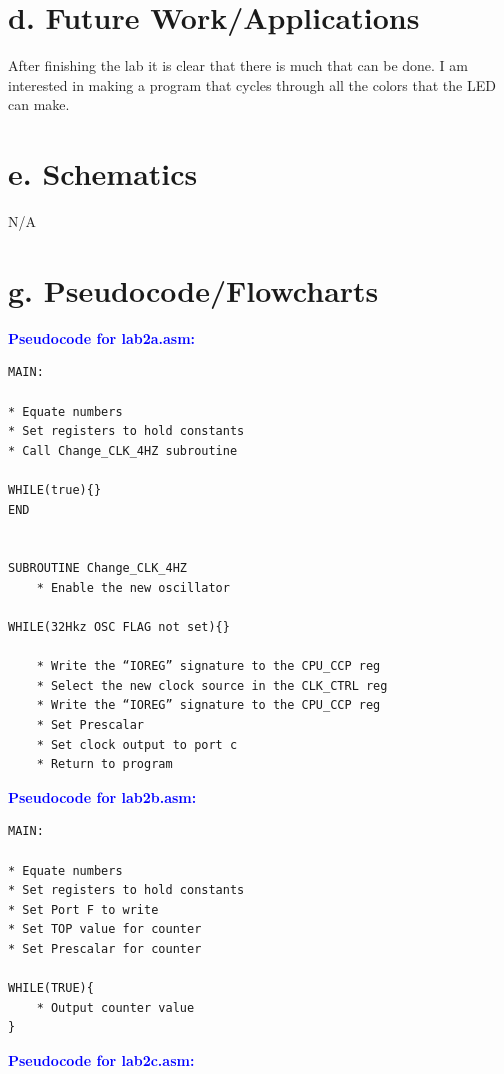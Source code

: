 \documentclass[11pt]{article}
\theoremstyle{plain}
\theoremstyle{definition}
\begin{document}
\section*{d. Future Work/Applications}
After finishing the lab it is clear that there is much that can be done. I am interested in making a program that cycles through all the colors that the LED can make.  
%
%
\section*{e. Schematics}
N/A
%
%
\newpage
\section*{g. Pseudocode/Flowcharts}
%
%
\textbf{\textcolor{blue}{Pseudocode for lab2a.asm:}}
\begin{tcolorbox}
\begin{verbatim}
MAIN:

* Equate numbers
* Set registers to hold constants
* Call Change_CLK_4HZ subroutine

WHILE(true){}
END


SUBROUTINE Change_CLK_4HZ
    * Enable the new oscillator

WHILE(32Hkz OSC FLAG not set){}

    * Write the “IOREG” signature to the CPU_CCP reg
    * Select the new clock source in the CLK_CTRL reg
    * Write the “IOREG” signature to the CPU_CCP reg
    * Set Prescalar
    * Set clock output to port c
	* Return to program
\end{verbatim}
\end{tcolorbox}
%
%
\newpage
\textbf{\textcolor{blue}{Pseudocode for lab2b.asm:}}
\begin{tcolorbox}
\begin{verbatim}
MAIN:

* Equate numbers
* Set registers to hold constants
* Set Port F to write
* Set TOP value for counter
* Set Prescalar for counter

WHILE(TRUE){
    * Output counter value
}
\end{verbatim}
\end{tcolorbox}	
%
%
\newpage
\textbf{\textcolor{blue}{Pseudocode for lab2c.asm:}}
\end{document}
